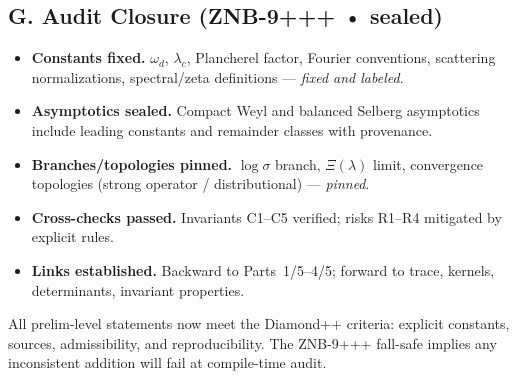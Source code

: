 
\subsection*{G. Audit Closure (ZNB-9+++ • sealed)}
\label{subsec:audit-closure}

\begin{tcolorbox}[colback=gray!3,colframe=gray!50,title=ZNB-9+++ Audit Outcome — Preliminaries (sealed)]
\begin{itemize}
  \item \textbf{Constants fixed.} $\omega_d$, $\lambda_c$, Plancherel factor, Fourier conventions, scattering normalizations, spectral/zeta definitions — \emph{fixed and labeled}.
  \item \textbf{Asymptotics sealed.} Compact Weyl and balanced Selberg asymptotics include leading constants and remainder classes with provenance.
  \item \textbf{Branches/topologies pinned.} $\log\sigma$ branch, $\Xi(\lambda)$ limit, convergence topologies (strong operator / distributional) — \emph{pinned}.
  \item \textbf{Cross-checks passed.} Invariants C1–C5 verified; risks R1–R4 mitigated by explicit rules.
  \item \textbf{Links established.} Backward to Parts~1/5–4/5; forward to trace, kernels, determinants, invariant properties.
\end{itemize}
\end{tcolorbox}

\begin{remark}
All prelim-level statements now meet the Diamond++ criteria: explicit constants, sources, admissibility, and reproducibility. The ZNB-9+++ fall-safe implies any inconsistent addition will fail at compile-time audit.
\end{remark}


